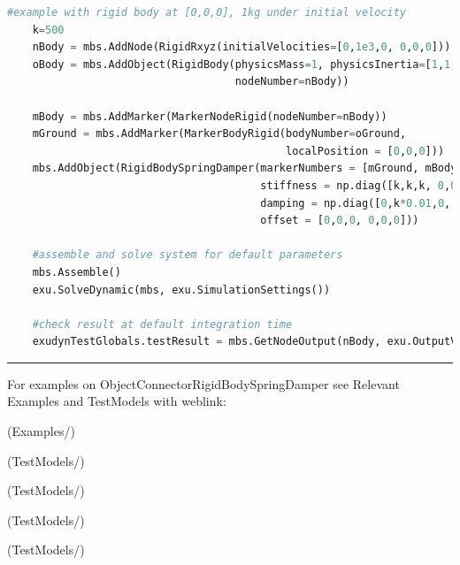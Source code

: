 \begin{lstlisting}[language=Python, firstnumber=1]
    #example with rigid body at [0,0,0], 1kg under initial velocity
    k=500
    nBody = mbs.AddNode(RigidRxyz(initialVelocities=[0,1e3,0, 0,0,0]))
    oBody = mbs.AddObject(RigidBody(physicsMass=1, physicsInertia=[1,1,1,0,0,0], 
                                    nodeNumber=nBody))
    
    mBody = mbs.AddMarker(MarkerNodeRigid(nodeNumber=nBody))
    mGround = mbs.AddMarker(MarkerBodyRigid(bodyNumber=oGround, 
                                            localPosition = [0,0,0]))
    mbs.AddObject(RigidBodySpringDamper(markerNumbers = [mGround, mBody], 
                                        stiffness = np.diag([k,k,k, 0,0,0]), 
                                        damping = np.diag([0,k*0.01,0, 0,0,0]), 
                                        offset = [0,0,0, 0,0,0]))
    
    #assemble and solve system for default parameters
    mbs.Assemble()
    exu.SolveDynamic(mbs, exu.SimulationSettings())
    
    #check result at default integration time
    exudynTestGlobals.testResult = mbs.GetNodeOutput(nBody, exu.OutputVariableType.Displacement)[1] 
\end{lstlisting}

\vspace{6pt}\par\noindent\rule{\textwidth}{0.4pt}
%
\noindent For examples on ObjectConnectorRigidBodySpringDamper see Relevant Examples and TestModels with weblink:
\bi
\item {} (Examples/)
\item {} (TestModels/)
\item {} (TestModels/)
\item {} (TestModels/)
\item {} (TestModels/)

